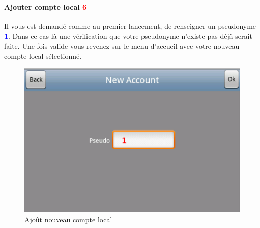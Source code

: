 \paragraph{Ajouter compte local \textcolor{red}{6}\\}
	Il vous est demandé comme au premier lancement, de renseigner un pseudonyme 
	\textcolor{blue}{\textbf{1}}. Dans ce cas là une vérification que votre
	pseudonyme n'existe pas déjà serait faite. Une fois valide vous revenez sur le menu d'accueil avec votre
	nouveau compte local sélectionné.
	\begin{figure}[H]
	\centering
		\includegraphics[scale=0.6]{Manuel/Img/9}
		\caption{Ajoût nouveau compte local}
	\end{figure}
	
	